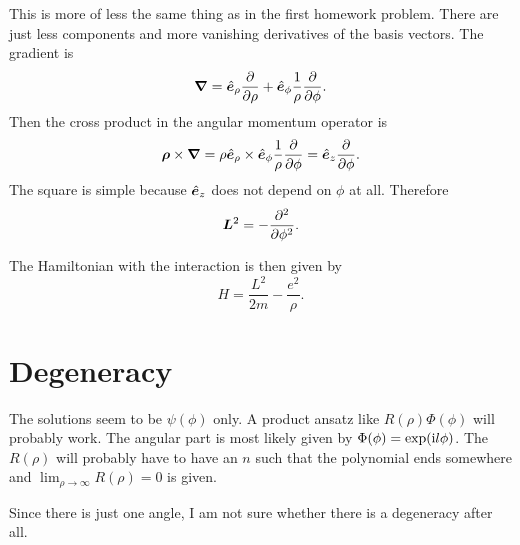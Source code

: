 \documentclass[11pt, english, fleqn, DIV=15, headinclude, BCOR=1cm]{scrartcl}
\begin{document}
This is more of less the same thing as in the first homework problem. There are
just less components and more vanishing derivatives of the basis vectors. The
gradient is
\[
    \boldsymbol{\nabla} = \hat{\boldsymbol{e}}_\rho \frac{\partial {}}{\partial {\rho}} + \hat{\boldsymbol{e}}_\phi \frac1\rho \frac{\partial {}}{\partial {\phi}}.
\]
Then the cross product in the angular momentum operator is
\[
    \boldsymbol{\rho} \times \boldsymbol{\nabla}
    = \rho \hat{\boldsymbol{e}}_\rho \times \hat{\boldsymbol{e}}_\phi \frac1\rho \frac{\partial {}}{\partial {\phi}}
    = \hat{\boldsymbol{e}}_z \frac{\partial {}}{\partial {\phi}}.
\]
The square is simple because $\hat{\boldsymbol{e}}_z$ does not depend on $\phi$ at all.
Therefore
\[
    \boldsymbol{L}^2 = - \frac{\partial {^2}}{\partial {\phi^2}}.
\]

The Hamiltonian with the interaction is then given by
\[
    H = \frac{L^2}{2m} - \frac{e^2}{\rho}.
\]

\section{Degeneracy}

The solutions seem to be $\psi(\phi)$ only. A product ansatz like $R(\rho)
\Phi(\phi)$ will probably work. The angular part is most likely given by
$\Phi(\phi) = \exp(\mathrm i l \phi)$. The $R(\rho)$ will probably have to have an
$n$ such that the polynomial ends somewhere and $\lim_{\rho\to\infty} R(\rho)
= 0$ is given.

Since there is just one angle, I am not sure whether there is a degeneracy
after all.
\end{document}
